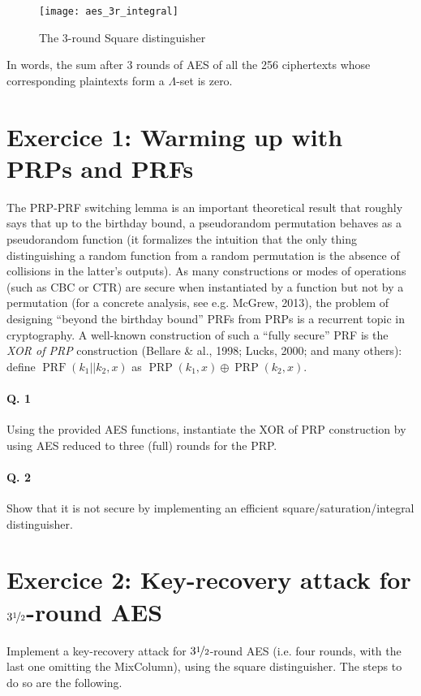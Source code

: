\documentclass[a4paper,11pt]{article}
\DeclareMathOperator\prf{PRF}
\DeclareMathOperator\prp{PRP}
\begin{document}
\begin{figure}[!hbt]
\centering
\texttt{[image: aes\_3r\_integral]}
\caption{The 3-round Square distinguisher\label{fig:square3}}
\end{figure}

In words, the sum after 3 rounds of AES of all the 256 ciphertexts whose corresponding plaintexts form a $\Lambda$-set is zero.


\section*{Exercice 1: Warming up with PRPs and PRFs}

The PRP-PRF switching lemma is an important theoretical result that roughly says that up to the birthday bound, a pseudorandom permutation
behaves as a pseudorandom function (it formalizes the intuition that the only thing distinguishing a random function from a random permutation
is the absence of collisions in the latter's outputs). As many constructions or modes of operations (such as CBC or CTR) are secure when instantiated
by a function but not by a permutation (for a concrete analysis, see e.g. McGrew, 2013),
the problem of designing ``beyond the birthday bound'' PRFs from PRPs is a recurrent topic in cryptography.
A well-known construction of such a ``fully secure'' PRF is the \emph{XOR of PRP} construction (Bellare \& al., 1998; Lucks, 2000; and many others):
define $\prf(k_1||k_2, x)$ as $\prp(k_1, x) \oplus \prp(k_2, x)$.

\paragraph*{Q. 1} Using the provided AES functions, instantiate the XOR of PRP construction by using AES reduced to three (full) rounds for the PRP.

\paragraph*{Q. 2} Show that it is not secure by implementing an efficient square/saturation/integral distinguisher.

\section*{Exercice 2: Key-recovery attack for $3\nicefrac{1}{2}$-round AES}

Implement a key-recovery attack for $3\nicefrac{1}{2}$-round AES (i.e. four rounds, with the last one omitting the MixColumn), using the square distinguisher.
The steps to do so are the following.
\end{document}
